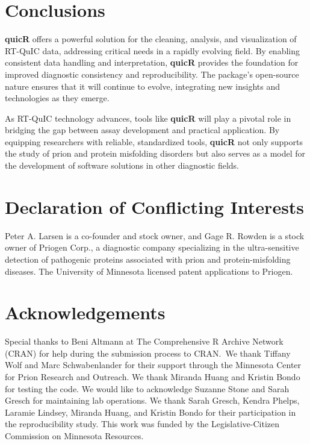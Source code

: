 \documentclass[preprint,12pt,a4paper]{elsarticle}
\begin{document}
    \section{Conclusions} 
        \textbf{quicR} offers a powerful solution for the cleaning, analysis, and visualization of RT-QuIC data, addressing critical needs in a rapidly evolving field. By enabling consistent data handling and interpretation, \textbf{quicR} provides the foundation for improved diagnostic consistency and reproducibility. The package's open-source nature ensures that it will continue to evolve, integrating new insights and technologies as they emerge.

        As RT-QuIC technology advances, tools like \textbf{quicR} will play a pivotal role in bridging the gap between assay development and practical application. By equipping researchers with reliable, standardized tools, \textbf{quicR} not only supports the study of prion and protein misfolding disorders but also serves as a model for the development of software solutions in other diagnostic fields.

    \section*{Declaration of Conflicting Interests}
        Peter A. Larsen is a co-founder and stock owner, and Gage R. Rowden is a stock owner of Priogen Corp., a diagnostic company specializing in the ultra-sensitive detection of pathogenic proteins associated with prion and protein-misfolding diseases. The University of Minnesota licensed patent applications to Priogen.

    \section*{Acknowledgements}
        Special thanks to Beni Altmann at The Comprehensive R Archive Network (CRAN) for help during the submission process to CRAN.\ We thank Tiffany Wolf and Marc Schwabenlander for their support through the Minnesota Center for Prion Research and Outreach. We thank Miranda Huang and Kristin Bondo for testing the code. We would like to acknowledge Suzanne Stone and Sarah Gresch for maintaining lab operations. We thank Sarah Gresch, Kendra Phelps, Laramie Lindsey, Miranda Huang, and Kristin Bondo for their participation in the reproducibility study. This work was funded by the Legislative-Citizen Commission on Minnesota Resources.


     
    
\end{document}
